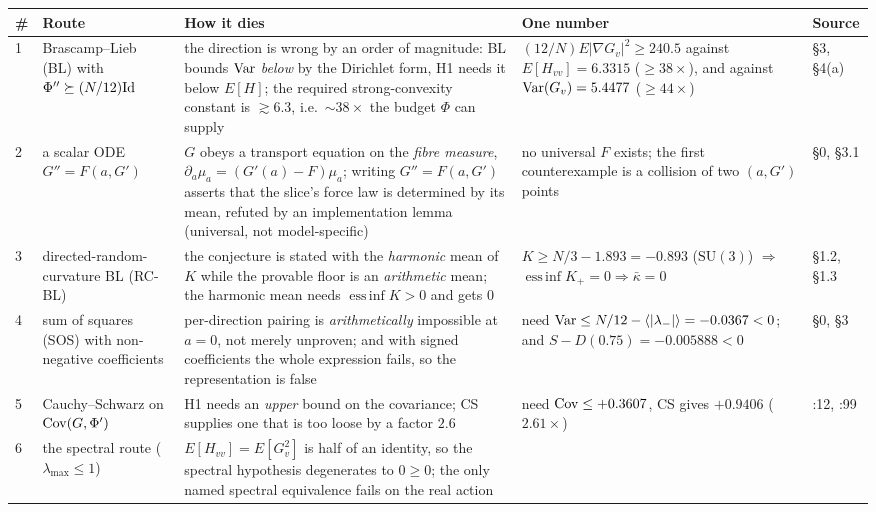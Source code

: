 {\footnotesize
\begin{longtable}{@{}L{0.45cm}L{2.1cm}L{4.55cm}L{2.55cm}L{4.3cm}@{}}
\toprule
\textbf{\#} & \textbf{Route} & \textbf{How it dies} & \textbf{One number} & \textbf{Source} \\
\midrule
{} & \LN{} Brascamp--Lieb (BL) with $\Phi''\succeq(N/12)\mathrm{Id}$
  & the direction is wrong by an order of magnitude: BL bounds $\operatorname{Var}$ \emph{below} by the
    Dirichlet form, H1 needs it below $E[H]$; the required strong-convexity constant is
    $\gtrsim6.3$, i.e.\ $\sim38\times$ the budget $\Phi$ can supply
  & $(12/N)E|\nabla G_v|^{2}\ge240.5$ against $E[H_{vv}]=6.3315$ ($\ge38\times$), and against
    $\operatorname{Var}(G_v)=5.4477$ ($\ge44\times$)
  &  \S3, \S4(a) \\
2 & \LN{} a scalar ODE $G''=F(a,G')$
  & $G$ obeys a transport equation on the \emph{fibre measure},
    $\partial_a\mu_a=(G'(a)-F)\mu_a$; writing $G''=F(a,G')$ asserts that the slice's force law is
    determined by its mean, refuted by an implementation lemma (universal, not model-specific)
  & no universal $F$ exists; the first counterexample is a collision of two $(a,G')$ points
  &  \S0, \S3.1 \\
3 & \LN{} directed-random-curvature BL (RC-BL)
  & the conjecture is stated with the \emph{harmonic} mean of $K$ while the provable floor is an
    \emph{arithmetic} mean; the harmonic mean needs $\operatorname{ess\,inf}K>0$ and gets $0$
  & $K\ge N/3-1.893=-0.893$ ($\mathrm{SU}(3)$) $\Rightarrow$
    $\operatorname{ess\,inf}K_+=0\Rightarrow\bar\kappa=0$
  &  \S1.2, \S1.3 \\
4 & \LN{} sum of squares (SOS) with non-negative coefficients
  & per-direction pairing is \emph{arithmetically} impossible at $a=0$, not merely unproven; and
    with signed coefficients the whole expression fails, so the representation is false
  & need $\operatorname{Var}\le N/12-\langle|\lambda_-|\rangle=-0.0367<0$; and
    $S-D(0.75)=-0.005888<0$
  &  \S0, \S3 \\
5 & \LN{} Cauchy--Schwarz on $\operatorname{Cov}(G,\Phi')$
  & H1 needs an \emph{upper} bound on the covariance; CS supplies one that is too loose by a
    factor $2.6$
  & need $\operatorname{Cov}\le+0.3607$, CS gives $+0.9406$ ($2.61\times$)
  & :12, :99 \\
6 & \LN{} the spectral route ($\lambda_{\max}\le1$)
  & $E[H_{vv}]=E[G_v^{2}]$ is half of an identity, so the spectral hypothesis degenerates to
    $0\ge0$; the only named spectral equivalence fails on the real action

\end{longtable}}
